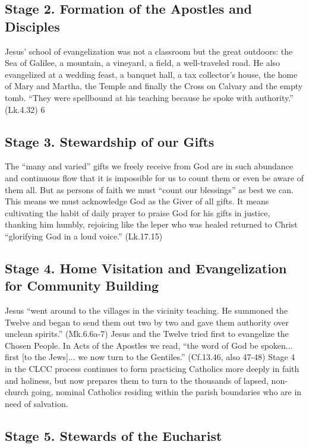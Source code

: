 \documentclass{article}
\begin{document}
\subsection{Stage 2. Formation of the Apostles and Disciples}

Jesus' school of evangelization was not a classroom but the great outdoors: the
Sea of Galilee, a mountain, a vineyard, a field, a well-traveled road. He also
evangelized at a wedding feast, a banquet hall, a tax collector's house, the
home of Mary and Martha, the Temple and finally the Cross on Calvary and the
empty tomb. ``They were spellbound at his teaching because he spoke with
authority.'' (Lk.4.32)
6

\subsection{Stage 3. Stewardship of our Gifts}

The ``many and varied'' gifts we freely receive from God are in such abundance
and continuous flow that it is impossible for us to count them or even be aware
of them all. But as persons of faith we must ``count our blessings'' as best we
can. This means we must acknowledge God as the Giver of all gifts. It means
cultivating the habit of daily prayer to praise God for his gifts in justice,
thanking him humbly, rejoicing like the leper who was healed returned to Christ
``glorifying God in a loud voice.'' (Lk.17.15)

\subsection{Stage 4. Home Visitation and Evangelization for Community Building}

Jesus ``went around to the villages in the vicinity teaching. He summoned the
Twelve and began to send them out two by two and gave them authority over
unclean spirits.'' (Mk.6.6a-7) Jesus and the Twelve tried first to evangelize
the Chosen People. In Acts of the Apostles we read, ``the word of God be
spoken... first [to the Jews]... we now turn to the Gentiles.'' (Cf.13.46, also
47-48) Stage 4 in the CLCC process continues to form practicing Catholics more
deeply in faith and holiness, but now prepares them to turn to the thousands of
lapsed, non-church going, nominal Catholics residing within the parish
boundaries who are in need of salvation.

\subsection{Stage 5. Stewards of the Eucharist}
\end{document}

